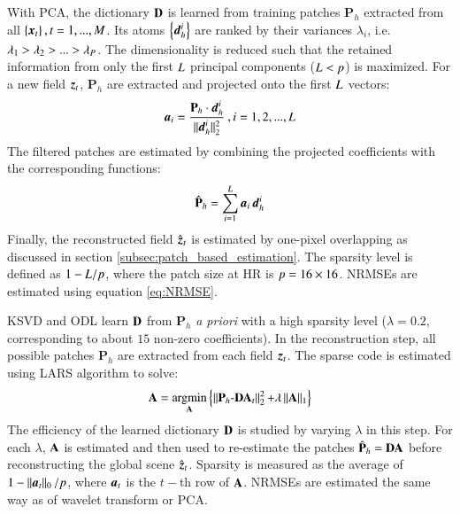With PCA, the dictionary $ \mathbf{D} $ is learned from training patches $ \mathbf{P}_h $ extracted from all $ \left\lbrace \operatorname{\boldsymbol{x}}_t \right\rbrace, t=1,...,M $. Its atoms  $ \left\lbrace \operatorname{\mathit{\boldsymbol{d}_h^{i}}} \right\rbrace $ are ranked by their variances $ \lambda_i $, i.e. $ \lambda_1 > \lambda_2 > ... > \lambda_{P} $. The dimensionality is reduced such that the retained information from only the first $ L $ principal components ($ L < p $) is maximized. For a new field $ \operatorname{\boldsymbol{z}}_t $, $ \mathbf{P}_h $ are extracted and projected onto the first $ L $ vectors:
\begin{equation}
	\boldsymbol{a}_i = \frac{\mathbf{P}_h \cdot  \operatorname{\mathit{\boldsymbol{d}_h^{i}}}}{\operatorname{\Arrowvert \mathit{\operatorname{\mathit{\boldsymbol{d}_h^{i}}}} \Arrowvert^2_2 }} \:, i=1,2,...,L
	\label{eq:DL_efficiency3}	
\end{equation}
The filtered patches are estimated by combining the projected coefficients with the corresponding functions:
\begin{equation}
	\hat{\mathbf{P}}_h = \sum\limits_{i=1}^{L} {\boldsymbol{a}_i \operatorname{\mathit{\boldsymbol{d}_h^{i}}}}
	\label{eq:DL_efficiency4}
\end{equation}
Finally, the reconstructed field $ \hat{\operatorname{\boldsymbol{z}}}_t $ is estimated by one-pixel overlapping as discussed in section \ref{subsec:patch_based_estimation}. The sparsity level is defined as $ 1-L/p $, where the patch size at HR is $ p = 16 \times 16 $. NRMSEs are estimated using equation \ref{eq:NRMSE}. 

KSVD and ODL learn $ \mathbf{D} $ from $ \mathbf{P}_h $ \textit{a priori} with a high sparsity level ($ \lambda =0.2$, corresponding to about $ 15 $ non-zero coefficients). In the reconstruction step, all possible patches $ \mathbf{P}_h $ are extracted from each field $ \operatorname{\boldsymbol{z}}_t $. The sparse code is estimated using LARS algorithm to solve:
\begin{equation}
	\mathbf{A} = \operatorname*{\arg\!\min}_{\mathbf{A}} \left\lbrace \operatorname{\Arrowvert \mathit{\mathbf{P}_h - \mathbf{D} \mathbf{A}_t} \Arrowvert^2_2 } + \lambda \operatorname{\Arrowvert \mathit{\mathbf{A}} \Arrowvert_1 } \right\rbrace
	\label{eq:DL_efficiency2}	
\end{equation}
The efficiency of the learned dictionary $ \mathbf{D} $ is studied by varying $ \lambda $ in this step. For each $ \lambda $, $ \mathbf{A} $ is estimated and then used to re-estimate the patches $ \hat{\mathbf{P}}_h = \mathbf{D} \mathbf{A}$ before reconstructing the global scene $ \hat{\operatorname{\boldsymbol{z}}}_t $. Sparsity is measured as the average of $ 1- \operatorname{\Arrowvert \mathit{\boldsymbol{a}_t} \Arrowvert_0 }/p $, where $ \boldsymbol{a}_t $ is the $ t- $th row of $ \mathbf{A} $. NRMSEs are estimated the same way as of wavelet transform or PCA.

